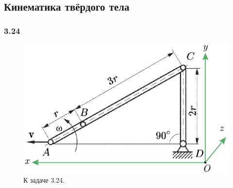 \subsection{Кинематика твёрдого тела}

\subsubsection*{3.24}


\begin{figure}
  \begin{center}
        \vspace{-10 mm}
        \includegraphics[width=0.9\linewidth]{img/3_24.pdf}
  \end{center}
    \caption{К задаче 3.24.}
\end{figure}


